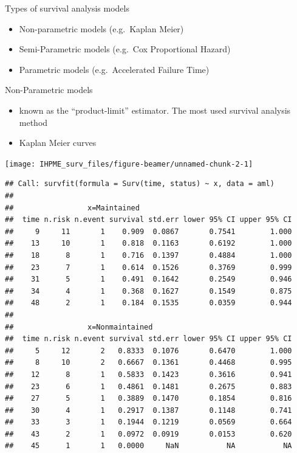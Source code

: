 \documentclass[
  ignorenonframetext,
]{beamer}
\providecommand{\tightlist}{%
  \setlength{\itemsep}{0pt}\setlength{\parskip}{0pt}}
\begin{document}
\begin{frame}{Types of survival analysis models}
\protect\hypertarget{types-of-survival-analysis-models}{}

\begin{itemize}
\tightlist
\item
  Non-parametric models (e.g.~Kaplan Meier)
\item
  Semi-Parametric models (e.g.~Cox Proportional Hazard)
\item
  Parametric models (e.g.~Accelerated Failure Time)
\end{itemize}

\end{frame}

\begin{frame}[fragile]{Non-Parametric models}
\protect\hypertarget{non-parametric-models}{}

\begin{itemize}
\item
  known as the ``product-limit'' estimator. The most used survival
  analysis method
\item
  Kaplan Meier curves
\end{itemize}

\texttt{[image: IHPME\_surv\_files/figure-beamer/unnamed-chunk-2-1]}

\begin{verbatim}
## Call: survfit(formula = Surv(time, status) ~ x, data = aml)
## 
##                 x=Maintained 
##  time n.risk n.event survival std.err lower 95% CI upper 95% CI
##     9     11       1    0.909  0.0867       0.7541        1.000
##    13     10       1    0.818  0.1163       0.6192        1.000
##    18      8       1    0.716  0.1397       0.4884        1.000
##    23      7       1    0.614  0.1526       0.3769        0.999
##    31      5       1    0.491  0.1642       0.2549        0.946
##    34      4       1    0.368  0.1627       0.1549        0.875
##    48      2       1    0.184  0.1535       0.0359        0.944
## 
##                 x=Nonmaintained 
##  time n.risk n.event survival std.err lower 95% CI upper 95% CI
##     5     12       2   0.8333  0.1076       0.6470        1.000
##     8     10       2   0.6667  0.1361       0.4468        0.995
##    12      8       1   0.5833  0.1423       0.3616        0.941
##    23      6       1   0.4861  0.1481       0.2675        0.883
##    27      5       1   0.3889  0.1470       0.1854        0.816
##    30      4       1   0.2917  0.1387       0.1148        0.741
##    33      3       1   0.1944  0.1219       0.0569        0.664
##    43      2       1   0.0972  0.0919       0.0153        0.620
##    45      1       1   0.0000     NaN           NA           NA
\end{verbatim}

\end{frame}
\end{document}
